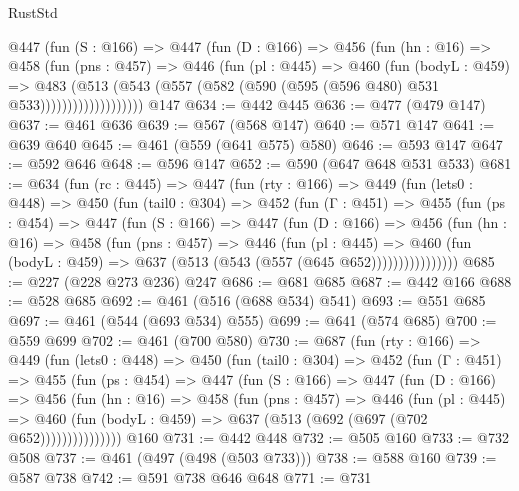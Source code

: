 \begin{lexlean}{RustStd}
\begin{coremodule}
                @447
                  (fun (S : @166) =>
                  @447
                    (fun (D : @166) =>
                    @456
                      (fun (hn : @16) =>
                      @458
                        (fun (pns : @457) =>
                        @446
                          (fun (pl : @445) =>
                          @460
                            (fun (bodyL : @459) =>
                            @483
                              (@513
                                (@543
                                  (@557 (@582 (@590 (@595 (@596 @480) @531 @533)))))))))))))))))))
    @147
@634 := @442 @445
@636 := @477 (@479 @147)
@637 := @461 @636
@639 := @567 (@568 @147)
@640 := @571 @147
@641 := @639 @640
@645 := @461 (@559 (@641 @575) @580)
@646 := @593 @147
@647 := @592 @646
@648 := @596 @147
@652 := @590 (@647 @648 @531 @533)
@681 := @634
    (fun (rc : @445) =>
    @447
      (fun (rty : @166) =>
      @449
        (fun (lets0 : @448) =>
        @450
          (fun (tail0 : @304) =>
          @452
            (fun (Γ : @451) =>
            @455
              (fun (ps : @454) =>
              @447
                (fun (S : @166) =>
                @447
                  (fun (D : @166) =>
                  @456
                    (fun (hn : @16) =>
                    @458
                      (fun (pns : @457) =>
                      @446
                        (fun (pl : @445) =>
                        @460
                          (fun (bodyL : @459) => @637 (@513 (@543 (@557 (@645 @652))))))))))))))))
@685 := @227 (@228 @273 @236) @247
@686 := @681 @685
@687 := @442 @166
@688 := @528 @685
@692 := @461 (@516 (@688 @534) @541)
@693 := @551 @685
@697 := @461 (@544 (@693 @534) @555)
@699 := @641 (@574 @685)
@700 := @559 @699
@702 := @461 (@700 @580)
@730 := @687
    (fun (rty : @166) =>
    @449
      (fun (lets0 : @448) =>
      @450
        (fun (tail0 : @304) =>
        @452
          (fun (Γ : @451) =>
          @455
            (fun (ps : @454) =>
            @447
              (fun (S : @166) =>
              @447
                (fun (D : @166) =>
                @456
                  (fun (hn : @16) =>
                  @458
                    (fun (pns : @457) =>
                    @446
                      (fun (pl : @445) =>
                      @460 (fun (bodyL : @459) => @637 (@513 (@692 (@697 (@702 @652)))))))))))))))
    @160
@731 := @442 @448
@732 := @505 @160
@733 := @732 @508
@737 := @461 (@497 (@498 (@503 @733)))
@738 := @588 @160
@739 := @587 @738
@742 := @591 @738 @646 @648
@771 := @731

\end{coremodule}
\end{lexlean}
